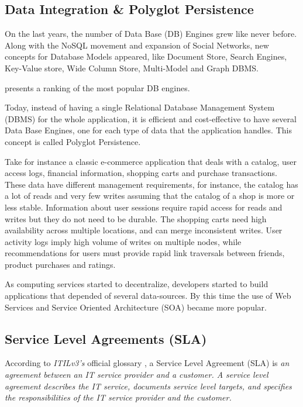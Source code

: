 \documentclass{article}
\begin{document}
\subsection{Data Integration \& Polyglot Persistence}
On the last years, the number of Data Base (DB) Engines grew like never before. Along with the NoSQL movement and expansion of Social Networks, new concepts for Database Models appeared, like Document Store, Search Engines, Key-Value store, Wide Column Store, Multi-Model and Graph DBMS. 

\cite{dbranking} presents a ranking of the most popular DB engines.


Today, instead of having a single Relational Database Management System (DBMS) for the whole application, it is efficient and cost-effective to have several Data Base Engines, one for each type of data that the application handles. This concept is called Polyglot Persistence.


Take for instance a classic e-commerce application that deals with a catalog, user access logs, financial information, shopping carts and purchase transactions. These data have different management requirements, for instance, the catalog has a lot of reads and very few writes assuming that the catalog of a shop is more or less stable. Information about user sessions require rapid access for reads and writes but they do not need to be durable. The shopping carts need high availability across multiple locations, and can merge inconsistent writes. User activity logs imply high volume of writes on multiple nodes, while recommendations for users must provide rapid link traversals between friends, product purchases and ratings. \cite{AdressingDataManagementCloud}






As computing services started to decentralize, developers started to build applications that depended of several data-sources. By this time the use of Web Services and Service Oriented Architecture (SOA) became more popular. 



\subsection{Service Level Agreements (SLA)}
According to \textit{ITILv3's} official glossary \cite{itilv3glossary}, a Service Level Agreement (SLA) is \textit{an agreement between an IT service provider and a customer.  A service level agreement describes the IT service, documents service level targets, and specifies the responsibilities of the IT service provider and the customer.} 
\end{document}
